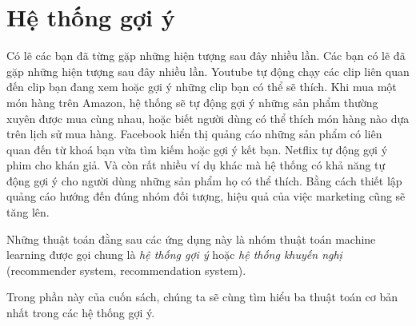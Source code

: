 \part{Hệ thống gợi ý}
\label{part:recsys}
Có lẽ các bạn đã từng gặp những hiện tượng sau đây nhiều lần. Các bạn có lẽ đã
gặp những hiện tượng sau đây nhiều lần. Youtube tự động chạy các clip liên quan
đến clip bạn đang xem hoặc gợi ý những clip bạn có thể sẽ thích. Khi mua một món
hàng trên Amazon, hệ thống sẽ tự động gợi ý những sản phẩm thường xuyên được mua
cùng nhau, hoặc biết người dùng có thể thích món hàng nào dựa trên lịch sử mua
hàng. Facebook hiển thị quảng cáo những sản phẩm có liên quan đến từ khoá bạn
vừa tìm kiếm hoặc gợi ý kết bạn. Netflix tự động gợi ý phim cho khán giả. Và còn
rất nhiều ví dụ khác mà hệ thống có khả năng tự động gợi ý cho người dùng những
sản phẩm họ {có thể thích}. Bằng cách thiết lập quảng cáo hướng đến đúng nhóm
đối tượng, hiệu quả của việc marketing cũng sẽ tăng lên.


Những thuật toán đằng sau các ứng dụng này là nhóm thuật toán machine learning
được gọi chung là \textit{hệ thống gợi ý} hoặc \textit{hệ thống khuyến nghị}
(recommender system, recommendation system).

 

Trong phần này của cuốn sách, chúng ta sẽ cùng tìm hiểu ba thuật toán cơ bản
nhất trong các hệ thống gợi ý.

